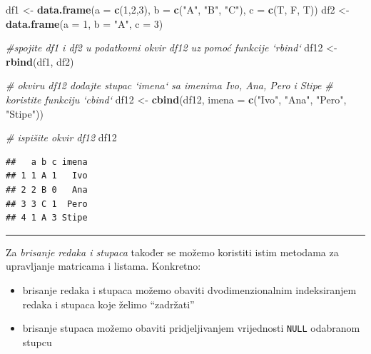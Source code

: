 \documentclass[]{book}
\newenvironment{Shaded}{\begin{snugshade}}{\end{snugshade}}
\newcommand{\KeywordTok}[1]{\textcolor[rgb]{0.13,0.29,0.53}{\textbf{#1}}}
\newcommand{\DataTypeTok}[1]{\textcolor[rgb]{0.13,0.29,0.53}{#1}}
\newcommand{\DecValTok}[1]{\textcolor[rgb]{0.00,0.00,0.81}{#1}}
\newcommand{\StringTok}[1]{\textcolor[rgb]{0.31,0.60,0.02}{#1}}
\newcommand{\CommentTok}[1]{\textcolor[rgb]{0.56,0.35,0.01}{\textit{#1}}}
\newcommand{\NormalTok}[1]{#1}
\providecommand{\tightlist}{%
  \setlength{\itemsep}{0pt}\setlength{\parskip}{0pt}}
\theoremstyle{definition}
\theoremstyle{definition}
\theoremstyle{definition}
\theoremstyle{remark}
\begin{document}
\begin{Shaded}
\begin{Highlighting}[]
\NormalTok{df1 <-}\StringTok{ }\KeywordTok{data.frame}\NormalTok{(}\DataTypeTok{a =} \KeywordTok{c}\NormalTok{(}\DecValTok{1}\NormalTok{,}\DecValTok{2}\NormalTok{,}\DecValTok{3}\NormalTok{), }\DataTypeTok{b =} \KeywordTok{c}\NormalTok{(}\StringTok{"A"}\NormalTok{, }\StringTok{"B"}\NormalTok{, }\StringTok{"C"}\NormalTok{), }\DataTypeTok{c =} \KeywordTok{c}\NormalTok{(T, F, T))}
\NormalTok{df2 <-}\StringTok{ }\KeywordTok{data.frame}\NormalTok{(}\DataTypeTok{a =} \DecValTok{1}\NormalTok{, }\DataTypeTok{b =} \StringTok{"A"}\NormalTok{, }\DataTypeTok{c =} \DecValTok{3}\NormalTok{)}

\CommentTok{#spojite df1 i df2 u podatkovni okvir df12 uz pomoć funkcije `rbind`}
\NormalTok{df12 <-}\StringTok{ }\KeywordTok{rbind}\NormalTok{(df1, df2)}

\CommentTok{# okviru df12 dodajte stupac `imena` sa imenima Ivo, Ana, Pero i Stipe}
\CommentTok{# koristite funkciju `cbind`}
\NormalTok{df12 <-}\StringTok{ }\KeywordTok{cbind}\NormalTok{(df12, }\DataTypeTok{imena =} \KeywordTok{c}\NormalTok{(}\StringTok{"Ivo"}\NormalTok{, }\StringTok{"Ana"}\NormalTok{, }\StringTok{"Pero"}\NormalTok{, }\StringTok{"Stipe"}\NormalTok{))}

\CommentTok{# ispišite okvir df12}
\NormalTok{df12}
\end{Highlighting}
\end{Shaded}

\begin{verbatim}
##   a b c imena
## 1 1 A 1   Ivo
## 2 2 B 0   Ana
## 3 3 C 1  Pero
## 4 1 A 3 Stipe
\end{verbatim}

\begin{center}\rule{0.5\linewidth}{\linethickness}\end{center}

Za \emph{brisanje redaka i stupaca} također se možemo koristiti istim
metodama za upravljanje matricama i listama. Konkretno:

\begin{itemize}
\tightlist
\item
  brisanje redaka i stupaca možemo obaviti dvodimenzionalnim
  indeksiranjem redaka i stupaca koje želimo ``zadržati''
\item
  brisanje stupaca možemo obaviti pridjeljivanjem vrijednosti
  \texttt{NULL} odabranom stupcu
\end{itemize}
\end{document}
